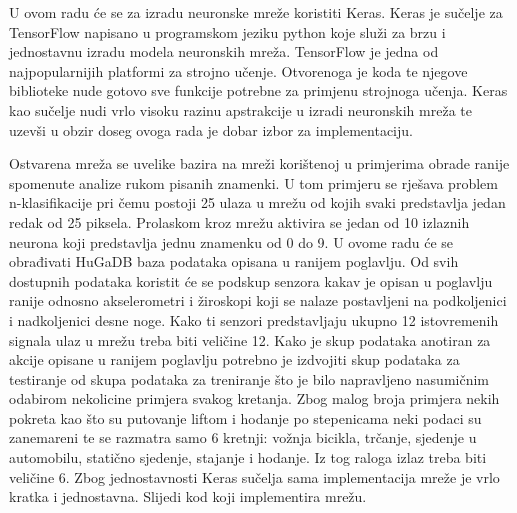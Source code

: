 \documentclass[times, utf8, diplomski]{fer}
\begin{document}
U ovom radu će se za izradu neuronske mreže koristiti Keras. Keras je sučelje za TensorFlow napisano u programskom jeziku
python koje služi za brzu i jednostavnu izradu modela neuronskih mreža.
TensorFlow je jedna od najpopularnijih platformi za strojno učenje. Otvorenoga je koda te njegove biblioteke
nude gotovo sve funkcije potrebne za primjenu strojnoga učenja. Keras kao sučelje nudi vrlo visoku razinu
apstrakcije u izradi neuronskih mreža te uzevši u obzir doseg ovoga rada je dobar izbor za implementaciju.

Ostvarena mreža se uvelike bazira na mreži korištenoj u primjerima obrade ranije spomenute analize rukom
pisanih znamenki. U tom primjeru se rješava problem n-klasifikacije pri čemu postoji 25 ulaza u mrežu od kojih
svaki predstavlja jedan redak od 25 piksela. Prolaskom kroz mrežu aktivira se jedan od 10 izlaznih neurona
koji predstavlja jednu znamenku od 0 do 9. U ovome radu će se obrađivati HuGaDB baza podataka opisana u ranijem
poglavlju. Od svih dostupnih podataka koristit će se podskup senzora kakav je opisan u poglavlju ranije odnosno
akselerometri i žiroskopi koji se nalaze postavljeni na podkoljenici i nadkoljenici desne noge. Kako ti senzori
predstavljaju ukupno 12 istovremenih signala ulaz u mrežu treba biti veličine 12. Kako je skup podataka anotiran
za akcije opisane u ranijem poglavlju potrebno je izdvojiti skup podataka za testiranje od skupa podataka za 
treniranje što je bilo napravljeno nasumičnim odabirom nekolicine primjera svakog kretanja. Zbog malog broja
primjera nekih pokreta kao što su putovanje liftom i hodanje po stepenicama neki podaci su zanemareni te se 
razmatra samo 6 kretnji: vožnja bicikla, trčanje, sjedenje u automobilu, statično sjedenje, stajanje i hodanje.
Iz tog raloga izlaz treba biti veličine 6. Zbog jednostavnosti Keras sučelja sama implementacija mreže je
vrlo kratka i jednostavna. Slijedi kod koji implementira mrežu.
\end{document}
